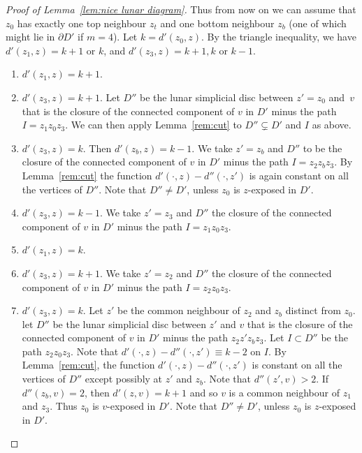 \documentclass[a4paper,12pt,leqno]{amsart}
\theoremstyle{definition}
\begin{document}
\begin{proof}[Proof of Lemma~\ref{lem:nice lunar diagram}]
Thus from now on we can assume that $z_0$ has exactly one top neighbour $z_t$ and one bottom neighbour $z_b$ (one of which might lie in $\partial D'$ if $m=4$). Let $k=d'(z_0, z)$. By the triangle inequality, we have $d'(z_1,z)=k+1$ or $k$, and $d'(z_3,z)=k+1,k$ or $k-1$. 

\begin{enumerate}
\item[\underline{Case 1}:] $d'(z_1,z) = k+1$. 
\item[(a)] $d'(z_3,z) = k+1$. 
Let $D''$ be the lunar simplicial disc between $z'=z_0$ and~$v$ that is the closure of the connected component of $v$ in $D'$ minus the path $I=z_1z_0z_3$. We can then apply Lemma~\ref{rem:cut} to $D''\subsetneq D'$ and $I$ as above. 
          
\item[(b)] $d'(z_3,z) = k$. Then $d'(z_b,z) = k-1$.
We take $z'=z_b$ and $D''$ to be the closure of the connected component of $v$ in $D'$ minus the path $I=z_2z_bz_3$. By Lemma~\ref{rem:cut} the function $d'(\cdot,z)-d''(\cdot,z')$ is again constant on all the vertices of $D''$. Note that $D''\neq D'$, unless $z_0$ is $z$-exposed in $D'$.
        
\item[(c)] $d'(z_3,z) = k-1$. We take $z' = z_3$ and $D''$ the closure of the connected component of $v$ in $D'$ minus the path $I=z_1z_0z_3$.

\item[\underline{Case 2}:] $d'(z_1,z) = k$. 
\item[(a)] $d'(z_3,z) = k+1$. We take $z' = z_2$ and $D''$ the closure of the connected component of $v$ in $D'$ minus the path $I=z_2z_0z_3$.

\item[(b)] $d'(z_3,z) = k$. 
Let $z'$ be the common neighbour of $z_2$ and $z_b$ distinct from $z_0$. let $D''$ be the lunar simplicial disc between $z'$ and $v$ that is the closure of the connected component of $v$ in $D'$ minus the path $z_2z'z_bz_3$. Let $I\subset D''$ be the path $z_2z_0z_3$. Note that $d'(\cdot,z)-d''(\cdot,z')\equiv k-2$ on $I$. By Lemma~\ref{rem:cut}, the function $d'(\cdot,z)-d''(\cdot,z')$ is constant on all the vertices of $D''$ except possibly at $z'$ and $z_b$. Note that $d''(z',v)>2$. If $d''(z_b,v)=2$, then $d'(z,v)=k+1$ and so $v$ is a common neighbour of $z_1$ and $z_3$. Thus $z_0$ is $v$-exposed in $D'$. Note that $D''\neq D'$, unless $z_0$ is $z$-exposed in $D'$.
 

\end{enumerate}
\end{proof}
\end{document}
